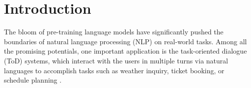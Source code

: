 \vspace{-.4em}
\section{Introduction}\label{sec:intro}
\vspace{-.4em}



The bloom of pre-training language models \citep[\eg,][]{devlin2018bert,bart2019,radford2019language,zhang2022opt} have significantly pushed the boundaries of natural language processing (NLP) on real-world tasks.  
Among all the promising potentials, one important application is the task-oriented dialogue (ToD) systems, which interact with the users in multiple turns via natural languages to accomplish tasks such as weather inquiry, ticket booking, or schedule planning \citep{chen2017survey,kwan2022survey}.

